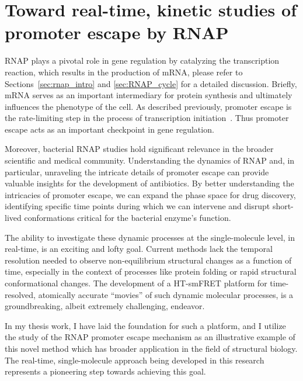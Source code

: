 \chapter{Toward real-time, kinetic studies of promoter escape by RNAP}
\label{chpt:towards_promoter-escape_movie}

RNAP plays a pivotal role in gene regulation by catalyzing the transcription reaction, which results in the production of \ac{mRNA}, please refer to Sections~\ref{sec:rnap_intro} and \ref{sec:RNAP_cycle} for a detailed discussion. 
Briefly, \ac{mRNA} serves as an important intermediary for protein synthesis and ultimately influences the phenotype of the cell.
As described previously, promoter escape is the rate-limiting step in the process of transcription initiation~\cite{murakami_structural_2002}. 
Thus promoter escape acts as an important checkpoint in gene regulation.

Moreover, bacterial \ac{RNAP} studies hold significant relevance in the broader scientific and medical community. 
Understanding the dynamics of \ac{RNAP} and, in particular, unraveling the intricate details of promoter escape can provide valuable insights for the development of antibiotics. 
By better understanding the intricacies of promoter escape, we can expand the phase space for drug discovery, identifying specific time points during which we can intervene and disrupt short-lived conformations critical for the bacterial enzyme's function.

The ability to investigate these dynamic processes at the single-molecule level, in real-time, is an exciting and lofty goal. 
Current methods lack the temporal resolution needed to observe non-equilibrium structural changes as a function of time, especially in the context of processes like protein folding or rapid structural conformational changes. 
The development of a \ac{HT-smFRET} platform for time-resolved, atomically accurate \enquote{movies} of such dynamic molecular processes, is a groundbreaking, albeit extremely challenging, endeavor.

In my thesis work, I have laid the foundation for such a platform, and I utilize the study of the \ac{RNAP} promoter escape mechanism as an illustrative example of this novel method which has broader application in the field of structural biology.
The real-time, single-molecule approach being developed in this research represents a pioneering step towards achieving this goal.

